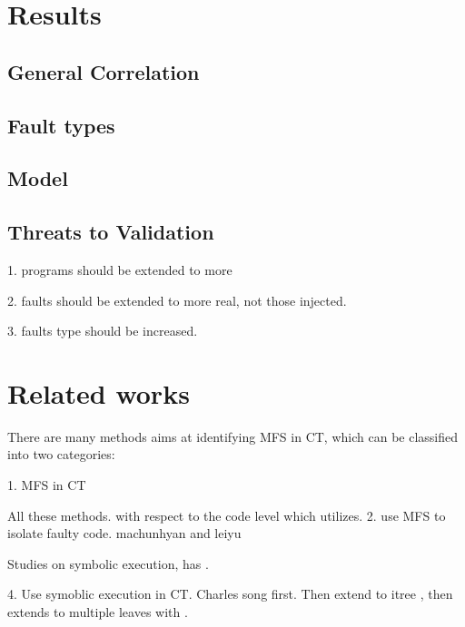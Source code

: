 \documentclass{sig-alternate-05-2015}
\begin{document}

\section{Results}\label{sec:results}

\subsection{General Correlation}

\subsection{Fault types}

\subsection{Model }


\subsection{Threats to Validation}


1. programs should be extended to more

2. faults should be extended to more real, not those injected.

3. faults type should be increased.

\section{Related works}\label{sec:related}

There are many methods aims at identifying MFS in CT, which can be classified into two categories:

1. MFS in CT




All these methods. with respect to the code level which utilizes.
2. use MFS to isolate faulty code. machunhyan \cite{ma2013locating}  and leiyu \cite{ghandehari2013fault}


Studies on symbolic execution, has .

4. Use symoblic execution in CT. Charles song \cite{reisner2010using} first. Then extend to itree \cite{song2012itree}, then extends to multiple leaves with \cite{song2014itree}.
\end{document}
